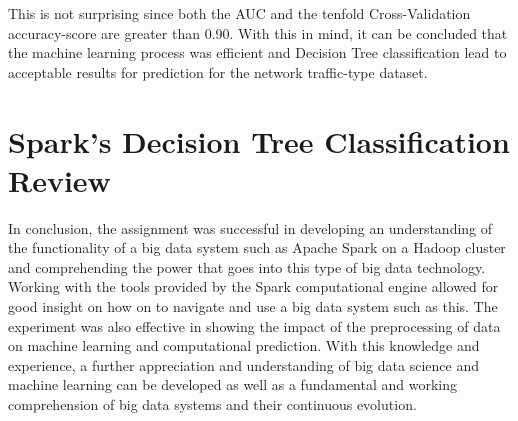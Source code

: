 \documentclass[a4paper,12pt]{IEEEtran}
\begin{document}
This is not surprising since both the AUC and the tenfold Cross-Validation accuracy-score are greater than 0.90. With this in mind, it can be concluded that the machine learning process was efficient and Decision Tree classification lead to acceptable results for prediction for the network traffic-type dataset.

\section{Spark's Decision Tree Classification Review}
In conclusion, the assignment was successful in developing an understanding of the functionality of a big data system such as Apache Spark on a Hadoop cluster and comprehending the power that goes into this type of big data technology. Working with the tools provided by the Spark computational engine allowed for good insight on how on to navigate and use a big data system such as this. The experiment was also effective in showing the impact of the preprocessing of data on machine learning and computational prediction. With this knowledge and experience, a further appreciation and understanding of big data science and machine learning can be developed as well as a fundamental and working comprehension of big data systems and their continuous evolution.
\end{document}
